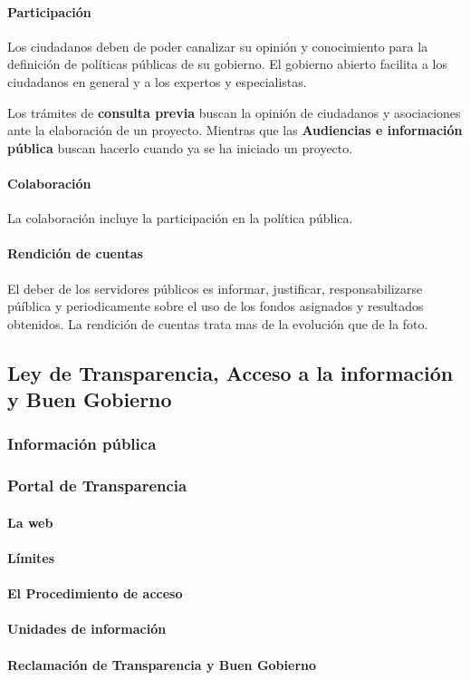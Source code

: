     \paragraph{Participación}
        Los ciudadanos deben de poder canalizar su opinión y conocimiento para la definición de políticas públicas de su gobierno. El gobierno abierto facilita a los ciudadanos en general y a los expertos y especialistas.

        Los trámites de \textbf{consulta previa} buscan la opinión de ciudadanos y asociaciones ante la elaboración de un proyecto. Mientras que las \textbf{Audiencias e información pública} buscan hacerlo cuando ya se ha iniciado un proyecto.

        \noindent{}

    \paragraph{Colaboración}
        La colaboración incluye la participación en la política pública.

    \paragraph{Rendición de cuentas}
        El deber de los servidores públicos es informar, justificar, responsabilizarse púíblica y periodicamente sobre el uso de los fondos asignados y resultados obtenidos. La rendición de cuentas trata mas de la evolución que de la foto.

\subsection{Ley de Transparencia, Acceso a la información y Buen Gobierno}
    \subsubsection{Información pública}
    \subsubsection{Portal de Transparencia}
        \paragraph{La web}
        \paragraph{Límites}
        \paragraph{El Procedimiento de acceso}
        \paragraph{Unidades de información}
        \paragraph{Reclamación de Transparencia y Buen Gobierno}